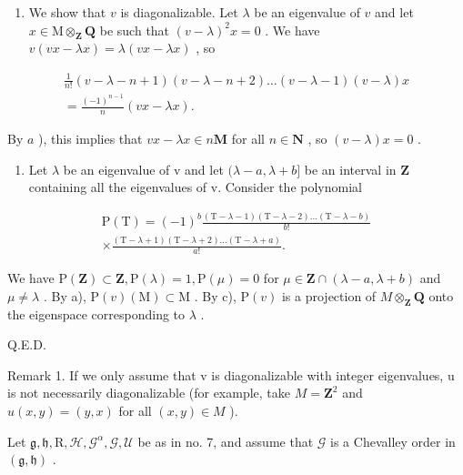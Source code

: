 \begin{enumerate}
\def\labelenumi{\alph{enumi})}
\setcounter{enumi}{2}
\tightlist
\item
  We show that \(v\) is diagonalizable. Let \(\lambda\) be an eigenvalue of \(v\) and let \(x \in \mathrm{M} \otimes_{\mathbf{Z}} \mathbf{Q}\) be such that \((v - \lambda)^2 x = 0\) . We have \(v(vx - \lambda x) = \lambda(vx - \lambda x)\) , so
\end{enumerate}

\[
\begin{array}{c} \frac {1}{n !} (v - \lambda - n + 1) (v - \lambda - n + 2) \ldots (v - \lambda - 1) (v - \lambda) x \\ = \frac {(- 1) ^ {n - 1}}{n} (v x - \lambda x). \end{array}
\]

By \(a\) ), this implies that \(vx - \lambda x \in n\mathbf{M}\) for all \(n \in \mathbf{N}\) , so \((v - \lambda)x = 0\) .

\begin{enumerate}
\def\labelenumi{\alph{enumi})}
\setcounter{enumi}{3}
\tightlist
\item
  Let \(\lambda\) be an eigenvalue of v and let \((\lambda - a, \lambda + b]\) be an interval in \(\mathbf{Z}\) containing all the eigenvalues of v. Consider the polynomial
\end{enumerate}

\[
\begin{array}{c} \mathrm{P(T)} = (- 1) ^ {b} \frac {(\mathrm{T} - \lambda - 1) (\mathrm{T} - \lambda - 2) \ldots (\mathrm{T} - \lambda - b)}{b !} \\ \times \frac {(\mathrm{T} - \lambda + 1) (\mathrm{T} - \lambda + 2) \ldots (\mathrm{T} - \lambda + a)}{a !}. \end{array}
\]

We have \(\mathrm{P}(\mathbf{Z})\subset\mathbf{Z},\mathrm{P}(\lambda)=1,\mathrm{P}(\mu)=0\) for \(\mu\in\mathbf{Z}\cap(\lambda-a,\lambda+b)\) and \(\mu\neq\lambda\) . By a), \(\mathrm{P}(v)(\mathrm{M})\subset\mathrm{M}\) . By c), \(\mathrm{P}(v)\) is a projection of \(M\otimes_{\mathbf{Z}}\mathbf{Q}\) onto the eigenspace corresponding to \(\lambda\) .

Q.E.D.

Remark 1. If we only assume that v is diagonalizable with integer eigenvalues, u is not necessarily diagonalizable (for example, take \(M = \mathbf{Z}^{2}\) and \(u(x, y) = (y, x)\) for all \((x, y) \in M\) ).

Let \(\mathfrak{g},\mathfrak{h},\mathrm{R},\mathcal{H},\mathcal{G}^{\alpha},\mathcal{G},\mathcal{U}\) be as in no. 7, and assume that \(\mathcal{G}\) is a Chevalley order in \((\mathfrak{g},\mathfrak{h})\) .

